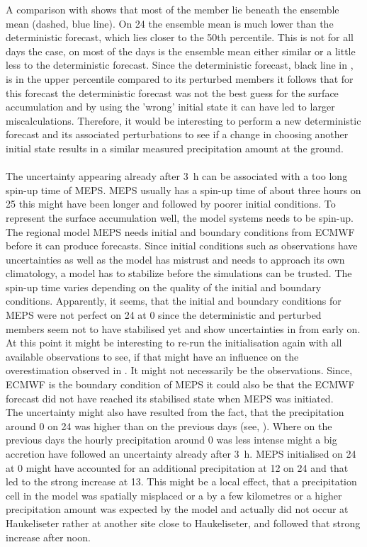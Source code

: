 A comparison with  shows that most of the member lie beneath the ensemble mean (dashed, blue line). On \SI{24}{\dec} the ensemble mean is much lower than the deterministic forecast, which lies closer to the 50th percentile. This is not for all days the case, on most of the days is the ensemble mean either similar or a little less to the deterministic forecast. Since the deterministic forecast, black line in , is in the upper percentile compared to its perturbed members it follows that for this forecast the deterministic forecast was not the best guess for the surface accumulation and by using the 'wrong' initial state it can have led to larger miscalculations. Therefore, it would be interesting to perform a new deterministic forecast and its associated perturbations to see if a change in choosing another initial state results in a similar measured precipitation amount at the ground.
\\
\\
The uncertainty appearing already after \SI{3}{\hour} can be associated with a too long spin-up time of MEPS. MEPS usually has a spin-up time of about three hours on \SI{25}{\dec} this might have been longer and followed by poorer initial conditions. To represent the surface accumulation well, the model systems needs to be spin-up. The regional model MEPS needs initial and boundary conditions from ECMWF before it can produce forecasts. Since initial conditions such as observations have uncertainties as well as the model has mistrust and needs to approach its own climatology, a model has to stabilize before the simulations can be trusted. The spin-up time varies depending on the quality of the initial and boundary conditions. Apparently, it seems, that the initial and boundary conditions for MEPS were not perfect on \SI{24}{\dec} at \SI{0}{\UTC} since the deterministic and perturbed members seem not to have stabilised yet and show uncertainties in  from early on.  At this point it might be interesting to re-run the initialisation again with all available observations to see, if that might have an influence on the overestimation observed in . It might not necessarily be the observations. Since, ECMWF is the boundary condition of MEPS it could also be that the ECMWF forecast did not have reached its stabilised state when MEPS was initiated.
\\
The uncertainty might also have resulted from the fact, that the precipitation around \SI{0}{\UTC} on \SI{24}{\dec} was higher than on the previous days (see, ). Where on the previous days the hourly precipitation around \SI{0}{\UTC} was less intense might a big accretion have followed an uncertainty already after \SI{3}{\hour}. MEPS initialised on \SI{24}{\dec} at \SI{0}{\UTC} might have accounted for an additional precipitation at \SI{12}{\UTC} on \SI{24}{\dec} and that led to the strong increase at \SI{13}{\UTC}. This might be a local effect, that a precipitation cell in the model was spatially misplaced or a by a few kilometres or a higher precipitation amount was expected by the model and actually did not occur at Haukeliseter rather at another site close to Haukeliseter, and followed that strong increase after noon. 
